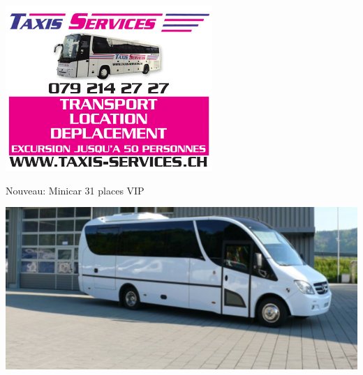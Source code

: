 {\centering
\includegraphics[width=.95\textwidth]{taxi.pdf}
\par
\vspace*{20mm}

{\Huge
Nouveau: Minicar 31 places VIP}
\par
\includegraphics[width=.8\textwidth]{bus.png}
\par
}
\clearpage
\thispagestyle{empty}%
